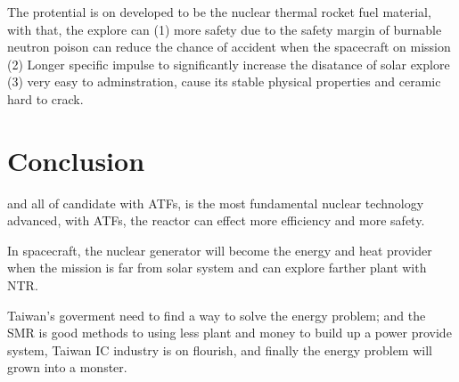\documentclass[final,10pt,times,twocolumn]{elsarticle}
\begin{document}
The  protential is on developed to be the nuclear thermal rocket fuel material, with that, the explore can (1) more safety due to the safety margin of burnable neutron poison can reduce the chance of accident when the spacecraft on mission (2) Longer specific impulse to significantly increase the disatance of solar explore (3)  very easy to adminstration, cause its stable physical properties and ceramic hard to crack.

\section{Conclusion}
 and all of candidate with ATFs, is the most fundamental nuclear technology advanced, with ATFs, the reactor can effect more efficiency and more safety.

In spacecraft, the nuclear generator will become the energy and heat provider when the mission is far from solar system and can explore farther plant with NTR.

Taiwan's goverment need to find a way to solve the energy problem; and the SMR is good methods to using less plant and money to build up a power provide system, Taiwan IC industry is on flourish, and finally the energy problem will grown into a monster.



\end{document}
